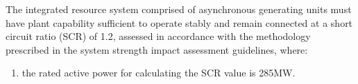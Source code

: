The integrated resource system comprised of asynchronous generating units must have plant capability sufficient to operate stably and remain connected at a short circuit ratio (SCR) of 1.2, assessed in accordance with the methodology prescribed in the system strength impact assessment guidelines, where:
\begin{enumerate}
	\item the rated active power for calculating the SCR value is 285MW.
\end{enumerate}
